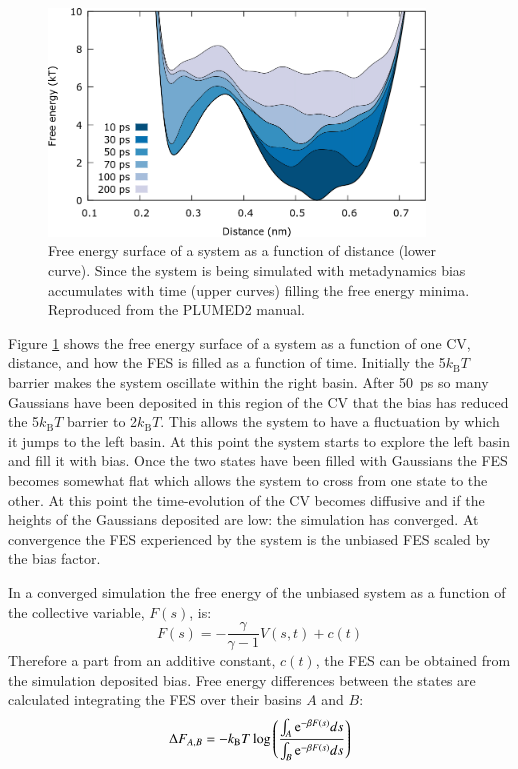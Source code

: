 \begin{figure}
\centering 
\includegraphics[width=10cm]{./images/FES_PLUMED.png}
\caption[Metadynamics free energy surface]{Free energy surface of a system as a function of 
distance 
(lower curve). Since the 
system is being simulated with metadynamics bias accumulates with time (upper curves) filling the 
free energy minima. Reproduced from the PLUMED2 manual\cite{Tribello2014}. }
\label{FES_PLUMED}
\end{figure}

 Figure \ref{FES_PLUMED} shows the free energy surface 
of a system as a function of one CV, distance,  and how the FES is filled as a function of time. 
Initially the 5$k_\text{B}T$ barrier makes the system oscillate within the right basin. After 
\SI{50}{\pico\second} so many Gaussians have been deposited in 
this region of the CV that the bias has reduced the 5$k_\text{B}T$ barrier to 2$k_\text{B}T$. 
This 
allows the system to have a fluctuation by which it jumps to the left basin. At this point 
the system starts to explore the left basin and fill it with bias. Once the two states have 
been filled with Gaussians the FES becomes somewhat flat which allows the system to cross from 
one state to the other. At this point the time-evolution of the CV becomes diffusive and if 
the heights of the Gaussians deposited are low: the simulation has converged. At convergence 
the FES experienced by the system is the unbiased FES scaled by the bias factor. 

In a converged simulation the free energy of the unbiased system as a function of the 
collective variable, 
$F(s)$, is:
\begin{equation}
F(s)=-\frac{\gamma}{\gamma-1}V(s,t)+c(t)
\end{equation}
Therefore a part from an additive constant, $c(t)$, the FES can be obtained from the simulation
deposited bias. Free energy differences between the states are calculated integrating the 
FES over their basins $A$ and $B$:
\begin{equation}
\Delta F_{A,B}=-k_\text{B}T\log\left(\frac{\int_A\mathrm{e}^{-\beta F(s)}ds}{\int_B\mathrm{e}^{-\beta 
F(s)}ds}\right) 
\end{equation}

